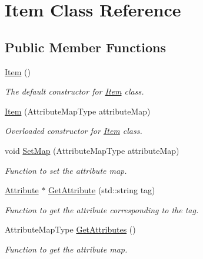 \hypertarget{class_item}{
\section{Item Class Reference}
\label{class_item}
}
\subsection*{Public Member Functions}
\begin{DoxyCompactItemize}
\item 
\hypertarget{class_item_a297720c02984eab37332ae795d22189d}{
\hyperlink{class_item_a297720c02984eab37332ae795d22189d}{Item} ()}
\label{class_item_a297720c02984eab37332ae795d22189d}

\begin{DoxyCompactList}\small\item\em The default constructor for \hyperlink{class_item}{Item} class. \item\end{DoxyCompactList}\item 
\hyperlink{class_item_ac9c188589ff209ff0e4e9838da193ca3}{Item} (AttributeMapType attributeMap)
\begin{DoxyCompactList}\small\item\em Overloaded constructor for \hyperlink{class_item}{Item} class. \item\end{DoxyCompactList}\item 
void \hyperlink{class_item_afb323f584854b113d78a960b43c2b743}{SetMap} (AttributeMapType attributeMap)
\begin{DoxyCompactList}\small\item\em Function to set the attribute map. \item\end{DoxyCompactList}\item 
\hyperlink{class_attribute}{Attribute} $\ast$ \hyperlink{class_item_a35c41c7d75ae090efb66e3faf300edb0}{GetAttribute} (std::string tag)
\begin{DoxyCompactList}\small\item\em Function to get the attribute corresponding to the tag. \item\end{DoxyCompactList}\item 
AttributeMapType \hyperlink{class_item_a7d2cbb55209cdd4aa1e9a5d19da0cb0f}{GetAttributes} ()
\begin{DoxyCompactList}\small\item\em Function to get the attribute map. \item\end{DoxyCompactList}\item 

\end{DoxyCompactItemize}
